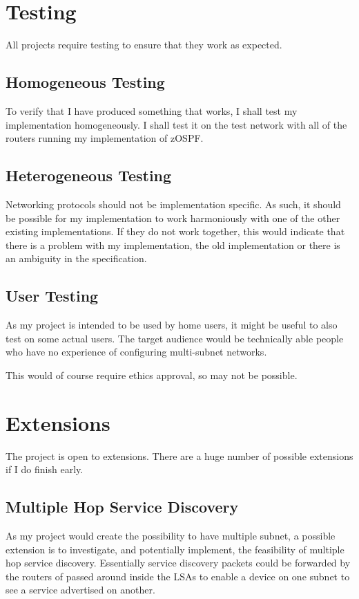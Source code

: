 \documentclass[12pt]{report}
\begin{document}
\section{Testing}
All projects require testing to ensure that they work as expected.

\subsection{Homogeneous Testing}
To verify that I have produced something that works, I shall test my
implementation homogeneously. I shall test it on the test network with all of
the routers running my implementation of zOSPF. 

\subsection{Heterogeneous Testing}
Networking protocols should not be implementation specific. As such, it should
be possible for my implementation to work harmoniously with one of the other
existing implementations. If they do not work together, this would indicate that
there is a problem with my implementation, the old implementation or there is an
ambiguity in the specification.

\subsection{User Testing}
As my project is intended to be used by home users, it might be useful to also
test on some actual users. The target audience would be technically able people
who have no experience of configuring multi-subnet networks. 

This would of course require ethics approval, so may not be possible.

\section{Extensions}

The project is open to extensions.  There are a huge number of possible
extensions if I do finish early.

\subsection{Multiple Hop Service Discovery}
As my project would create the possibility to have multiple subnet, a possible
extension is to investigate, and potentially implement, the feasibility of
multiple hop service discovery. Essentially service discovery packets could be
forwarded by the routers of passed around inside the LSAs to enable a device on
one subnet to see a service advertised on another.
\end{document}
